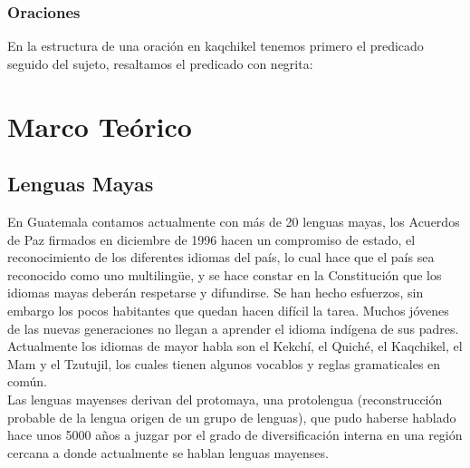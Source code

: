 \documentclass[a4paper,openright,11pt]{article}
\begin{document}
\subsubsection{Oraciones}
En la estructura de una oración en kaqchikel tenemos primero el predicado seguido del sujeto, resaltamos el predicado con negrita:
\begin{table}[H]
	\begin{center}
	\end{center}
	\caption{Regla gramatical de una oración simple}
\end{table}
\newpage

\section{Marco Teórico}
\subsection{Lenguas Mayas}
En Guatemala contamos actualmente con más de 20 lenguas mayas,  los Acuerdos de Paz firmados en diciembre de 1996 hacen un compromiso de estado, el reconocimiento de los diferentes idiomas del país, lo cual hace que el país sea reconocido como uno multilingüe, y se hace constar en la Constitución que los idiomas mayas deberán respetarse y difundirse. Se han hecho esfuerzos, sin embargo los pocos habitantes que quedan hacen difícil la tarea. Muchos jóvenes de las nuevas generaciones no llegan a aprender el idioma indígena de sus padres. Actualmente los idiomas de mayor habla son el Kekchí, el Quiché, el Kaqchikel, el Mam y el Tzutujil, los cuales tienen algunos vocablos y reglas gramaticales en común. \\

Las lenguas mayenses derivan del protomaya, una protolengua (reconstrucción probable de la lengua origen de un grupo de lenguas), que pudo haberse hablado hace unos 5000 años a juzgar por el grado de diversificación interna en una región cercana a donde actualmente se hablan lenguas mayenses.
\end{document}
